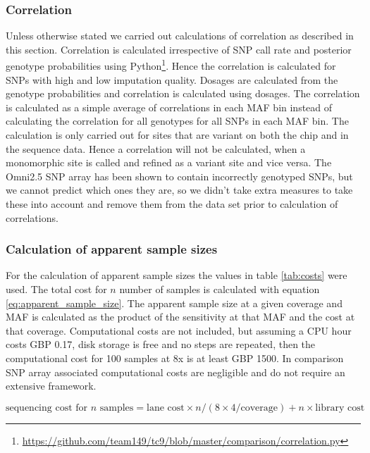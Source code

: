 \subsubsection{Correlation}
Unless otherwise stated we carried out calculations of correlation as described in this section. Correlation is calculated irrespective of SNP call rate and posterior genotype probabilities using Python\footnote{\url{https://github.com/team149/tc9/blob/master/comparison/correlation.py}}. Hence the correlation is calculated for \glspl{SNP} with high and low imputation quality. Dosages are calculated from the genotype probabilities and correlation is calculated using dosages. The correlation is calculated as a simple average of correlations in each \gls{MAF} bin instead of calculating the correlation for all genotypes for all \glspl{SNP} in each \gls{MAF} bin. The calculation is only carried out for sites that are variant on both the chip and in the sequence data. Hence a correlation will not be calculated, when a monomorphic site is called and refined as a variant site and vice versa. The Omni2.5 \gls{SNP} array has been shown to contain incorrectly genotyped SNPs\cite{Gurdasani2015}, but we cannot predict which ones they are, so we didn't take extra measures to take these into account and remove them from the data set prior to calculation of correlations.

\subsubsection{Calculation of apparent sample sizes}
\label{subsec:samplesize}
For the calculation of apparent sample sizes the values in table \ref{tab:costs} were used. The total cost  for $n$ number of samples is calculated with equation \ref{eq:apparent_sample_size}. The apparent sample size at a given coverage and \gls{MAF} is calculated as the product of the sensitivity at that \gls{MAF} and the cost at that coverage. Computational costs are not included, but assuming a \gls{CPU} hour costs \gls{GBP} 0.17, disk storage is free and no steps are repeated, then the computational cost for 100 samples at 8x is at least \gls{GBP} 1500. In comparison \gls{SNP} array associated computational costs are negligible and do not require an extensive framework.


\begin{equation}
\text{sequencing cost for } n \text{ samples} = \text{lane cost} \times n/(8 \times 4 / \text{coverage}) + n \times \text{library cost}
\label{eq:apparent_sample_size}
\end{equation}